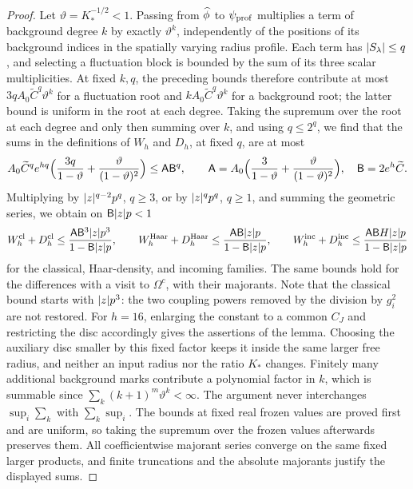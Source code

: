 \begin{proof}
Let $\vartheta=K_*^{-1/2}<1$. Passing from $\widehat\phi$ to $\psi_{\mathrm{prof}}$ multiplies a term of background degree $k$ by exactly $\vartheta^k$, independently of the positions of its background indices in the spatially varying radius profile. Each term has $\lvert S_\lambda\rvert\le q$, and selecting a fluctuation block is bounded by the sum of its three scalar multiplicities. At fixed $k,q$, the preceding bounds therefore contribute at most $3qA_0\widetilde C^q\vartheta^k$ for a fluctuation root and $kA_0\widetilde C^q\vartheta^k$ for a background root; the latter bound is uniform in the root at each degree. Taking the supremum over the root at each degree and only then summing over $k$, and using $q\le2^q$, we find that the sums in the definitions of $W_h$ and $D_h$, at fixed $q$, are at most
\[
 A_0\widetilde C^qe^{hq}\Bigl(\frac{3q}{1-\vartheta}+\frac\vartheta{(1-\vartheta)^2}\Bigr)\le\mathsf A\mathsf B^q,\qquad\mathsf A=A_0\Bigl(\frac3{1-\vartheta}+\frac\vartheta{(1-\vartheta)^2}\Bigr),\quad\mathsf B=2e^h\widetilde C.
\]
Multiplying by $\lvert z\rvert^{q-2}p^q$, $q\ge3$, or by $\lvert z\rvert^qp^q$, $q\ge1$, and summing the geometric series, we obtain on $\mathsf B\lvert z\rvert p<1$
\[
 W_h^{\mathrm{cl}}+D_h^{\mathrm{cl}}\le\frac{\mathsf A\mathsf B^3\lvert z\rvert p^3}{1-\mathsf B\lvert z\rvert p},\qquad
 W_h^{\mathrm{Haar}}+D_h^{\mathrm{Haar}}\le\frac{\mathsf A\mathsf B\lvert z\rvert p}{1-\mathsf B\lvert z\rvert p},\qquad
 W_h^{\mathrm{inc}}+D_h^{\mathrm{inc}}\le\frac{\mathsf A\mathsf BH\lvert z\rvert p}{1-\mathsf B\lvert z\rvert p}
\]
for the classical, Haar-density, and incoming families. The same bounds hold for the differences with a visit to $\Omega^c$, with their majorants. Note that the classical bound starts with $\lvert z\rvert p^3$: the two coupling powers removed by the division by $g_i^2$ are not restored. For $h=16$, enlarging the constant to a common $C_J$ and restricting the disc accordingly gives the assertions of the lemma. Choosing the auxiliary disc smaller by this fixed factor keeps it inside the same larger free radius, and neither an input radius nor the ratio $K_*$ changes. Finitely many additional background marks contribute a polynomial factor in $k$, which is summable since $\sum_k(k+1)^m\vartheta^k<\infty$. The argument never interchanges $\sup_i\sum_k$ with $\sum_k\sup_i$. The bounds at fixed real frozen values are proved first and are uniform, so taking the supremum over the frozen values afterwards preserves them. All coefficientwise majorant series converge on the same fixed larger products, and finite truncations and the absolute majorants justify the displayed sums.
\end{proof}

